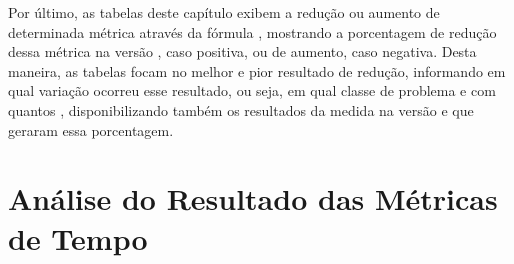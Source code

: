Por último, as tabelas deste capítulo exibem a redução ou aumento de determinada métrica através da fórmula , mostrando a porcentagem de redução dessa métrica na versão \ASYNC, caso positiva, ou de aumento, caso negativa. Desta maneira, as tabelas focam no melhor e pior resultado de redução, informando em qual variação ocorreu esse resultado, ou seja, em qual classe de problema e com quantos \clusters, disponibilizando também os resultados da medida na versão \IPC e \ASYNC que geraram essa porcentagem.

\section{Análise do Resultado das Métricas de Tempo}
\label{sec:metricastempo}

\begin{table}[h]
\centering
\caption{Reduções ao comparar-se os tempos dos processos \slaves.}
\label{tab:slavetable}
\end{table}

